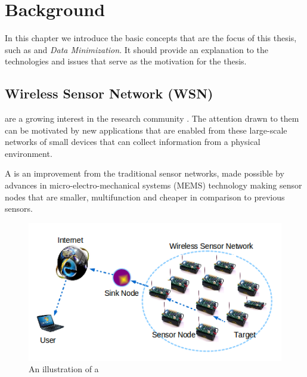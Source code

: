 \chapter{Background}

In this chapter we introduce the basic concepts that are the focus of this thesis, such as \wsns and \textit{Data Minimization}. It should provide an explanation to the technologies and issues that serve as the motivation for the thesis. %


\section{Wireless Sensor Network (WSN)}



\wsns are a growing interest in the research community \cite{wsnsurvey, akyildiz2007survey, min2001low}. The attention drawn to them can be motivated by new applications that are enabled from these large-scale networks of small devices that can collect information from a physical environment.

A \wsn is an improvement from the traditional sensor networks, made possible by advances in micro-electro-mechanical systems (MEMS) technology\cite{sohrabi2000protocols, min2001low} making sensor nodes that are smaller, multifunction and cheaper in comparison to previous sensors. 

\begin{figure}[ht]
    \includegraphics{include/figures/WSN_illu}
    \caption{An illustration of a \wsn}
    \label{fig:wsn_illustration}
\end{figure}

